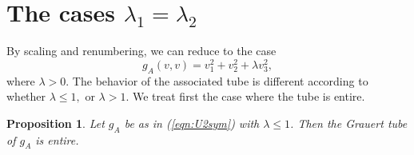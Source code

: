 \documentclass[12pt,reqno]{amsart}\usepackage{amssymb,amsmath,amscd,epsfig,amsthm,enumerate,import,eufrak}
\newtheorem{proposition}[theorem]{Proposition}
\theoremstyle{definition}
\theoremstyle{remark}
\numberwithin{equation}{section}
\theoremstyle{plain}
\theoremstyle{definition}
\def \vs {\vskip 2mm}
\theoremstyle{remark}
\numberwithin{theorem}{section}
\begin{document}
\section{The cases $\lambda_1 = \lambda_2$} \label{sec:U2cases}
\vs
By scaling and renumbering, we can reduce to the case 
\begin{equation}\label{eqn:U2sym}
	g_A(v,v) = v_1^2 + v_2^2 + \lambda v_3^2,
\end{equation}
%
where $\lambda > 0$. The behavior of the associated tube is different according to whether $\lambda \leq 1,$ or $\lambda > 1$. We treat first the case where the tube is entire.
\vs
\begin{proposition} \label{prop:poscase}
%
	Let $g_A$ be as in (\ref{eqn:U2sym}) with $\lambda \leq 1$. Then the Grauert tube of $g_A$ is entire.
%
\end{proposition}
%
\end{document}

